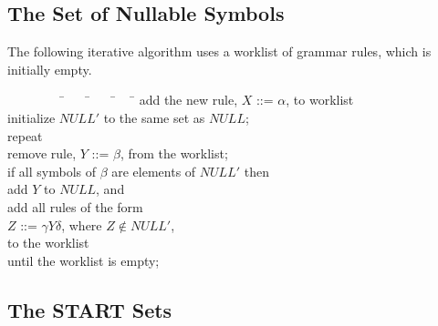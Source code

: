 \subsection{The Set of Nullable Symbols}

The following iterative algorithm uses a worklist of grammar rules,
which is initially empty.

\begin{tabbing}
\ \ \ \ \ \ \ \ \=\ \ \ \ \=\ \ \ \ \=\ \ \ \ \= \kill
\>      add the new rule, $X$ ::= $\alpha$, to worklist\\
\>      initialize $NULL'$ to the same set as $NULL$;\\
\>      repeat\\
\>\>       remove rule, $Y$ ::= $\beta$, from the worklist;\\
\>\>       if all symbols of $\beta$ are elements of $NULL'$ then\\
\>\>\>        add $Y$ to $NULL$, and\\
\>\>\>        add all rules of the form\\
\>\>\>\>         $Z$ ::= $\gamma Y \delta$, where $Z \not\in NULL'$,\\
\>\>\>\>         to the worklist\\
\>      until the worklist is empty;
\end{tabbing}

\subsection{The START Sets}

